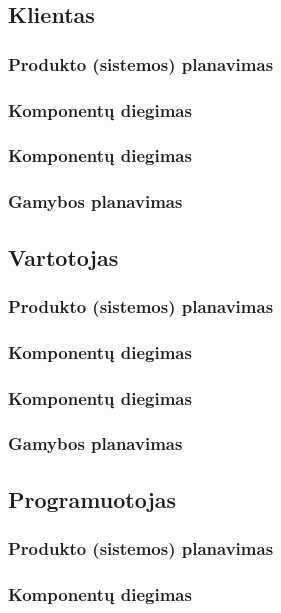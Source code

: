 \documentclass{VUMIFPSkursinis}
\begin{document}
		\subsection{Klientas}
			\subsubsection{Produkto (sistemos) planavimas}
			\subsubsection{Komponentų diegimas}
			\subsubsection{Komponentų diegimas}
			\subsubsection{Gamybos planavimas}
		\subsection{Vartotojas}
		
			\subsubsection{Produkto (sistemos) planavimas}
			\subsubsection{Komponentų diegimas}
			\subsubsection{Komponentų diegimas}
			\subsubsection{Gamybos planavimas}
		\subsection{Programuotojas}
			\subsubsection{Produkto (sistemos) planavimas}
			\subsubsection{Komponentų diegimas}
\end{document}
